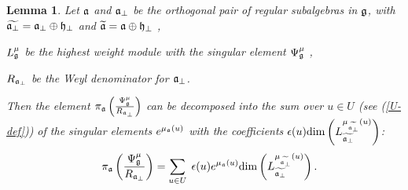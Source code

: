 \documentclass[12pt]{iopart}
\newtheorem{lemma}{Lemma}
\theoremstyle{definition}
\begin{document}
\begin{lemma}
Let $\frak{a}$ and $\frak{a}_{\perp }$ be the orthogonal pair of regular
subalgebras in $\frak{g}$, with $\widetilde{\frak{a}_{\perp }}=\frak{a}%
_{\perp }\oplus \frak{h}_{\perp }$ and $\widetilde{\frak{a}}=\frak{a}\oplus
\frak{h}_{\perp }$ ,

$L_{\frak{g}}^{\mu }$ be the highest weight module with the singular element
$\Psi _{\frak{g}}^{\mu }$ ,

$R_{\frak{a}_{\perp }}$ be the Weyl denominator for $\frak{a}_{\perp }$.

Then the element $\pi _{\frak{a}}\left( \frac{\Psi _{\frak{g}}^{\mu }}{R_{%
\frak{a}_{\perp }}}\right) $ can be decomposed into the sum over $u\in U$ (see (\ref{U-def})) of
the singular elements $e^{\mu _{\frak{a}}\left( u\right) }$ with the
coefficients $\epsilon (u)\mathrm{\dim }\left( L_{\widetilde{\frak{a}_{\perp
}}}^{\mu _{\widetilde{\frak{a}_{\perp }}}\left( u\right) }\right) $:
\begin{equation}
\quad \pi _{\frak{a}}\left( \frac{\Psi _{\frak{g}}^{\mu }}{R_{\frak{a}%
_{\perp }}}\right) =\sum_{u\in U}\;\epsilon (u)e^{\mu _{\frak{a}}\left(
u\right) }\mathrm{\dim }\left( L_{\widetilde{\frak{a}_{\perp }}}^{\mu _{%
\widetilde{\frak{a}_{\perp }}}\left( u\right) }\right) .
\end{equation}
\end{lemma}
\end{document}
